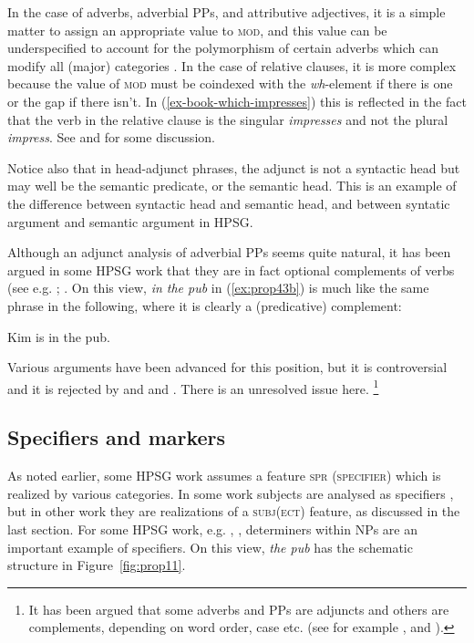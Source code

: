 \documentclass[output=paper
	        ,collection
	        ,collectionchapter
 	        ,biblatex
                ,babelshorthands
                ,newtxmath
                ,draftmode
                ,colorlinks, citecolor=brown
]{langscibook}
\begin{document}
In the case of adverbs, adverbial PPs, and attributive adjectives, it is a simple matter to assign
an appropriate value to \textsc{mod}, and this value can be underspecified to account for the
polymorphism of certain adverbs which can modify all (major) categories
\citep{AG2003b-u}\addpages. In the case of relative clauses, it is more complex because the value of
\textsc{mod} must be coindexed with the \emph{wh}-element if there is one or the gap if there
isn’t. In (\ref{ex-book-which-impresses}) this is reflected in the fact that the verb in the
relative clause is the singular \emph{impresses} and not the plural \emph{impress}. See
 and  for some discussion. 

Notice also that in head-adjunct phrases, the adjunct is not a syntactic head but may well be the semantic predicate, or the semantic head. This is an example of the difference between syntactic head and semantic head, and between syntatic argument and semantic argument in HPSG.

Although an adjunct analysis of adverbial PPs seems quite natural, it has been argued in some HPSG work that they are in fact optional complements of verbs (see e.g. \citealp[4]{AG97a-u,BMS2001a}; \citealp[168, Footnote~2]{GSag2000a-u}. On this view, \emph{in the pub} in (\ref{ex:prop43b}) is much like the same phrase in the following, where it is clearly a (predicative) complement:

\ea\label{ex:prop44}
Kim is in the pub. 
\z

\noindent
Various arguments have been advanced for this position, but it is controversial and it is rejected by \citet{Levine2003a} and \citet[Chapter~3]{LH2006a} and \citet{Chaves2009a}. There is an unresolved issue here.%
%
\footnote{It has been argued that some adverbs and PPs are adjuncts and others are complements, depending on word order, case etc. (see for example \citealp{Prze99}, \citealp{HA2014a-u} and ).}
%

\subsection{Specifiers and markers}\label{sec:prop6.2}

As noted earlier, some HPSG work assumes a feature \textsc{spr (specifier)} which is realized by various categories. In some work subjects are analysed as specifiers \citep*[100--103]{SWB2003a}, but in other work they are realizations of a \textsc{subj(ect)} feature, as discussed in the last section. For some HPSG work, e.g. , , determiners within NPs are an important example of specifiers. On this view, \emph{the pub} has the schematic structure in Figure~\ref{fig:prop11}.
\end{document}

